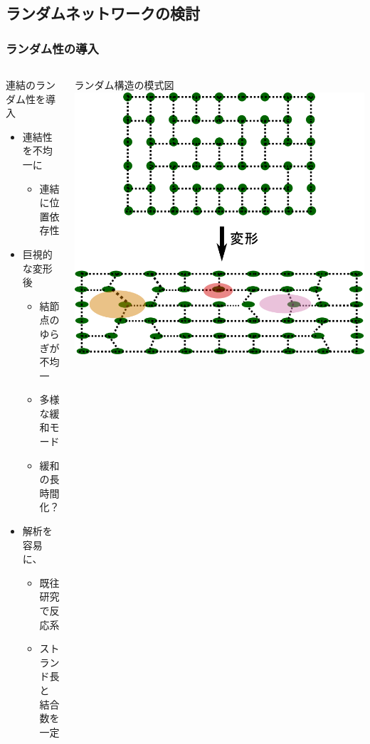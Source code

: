 \documentclass[12pt, dvipdfmx]{beamer}
\begin{document}
\subsection{ランダムネットワークの検討}
\begin{frame}
    \frametitle{ランダム性の導入}
    \vspace{-3mm}
		\begin{columns}[totalwidth=1\textwidth]
				\begin{block}{連結のランダム性を導入}
					\begin{itemize}
						\item 連結性を不均一に
							\begin{itemize}
								\item 連結に\alert{位置依存性}
							\end{itemize}
						\item 巨視的な変形後
							\begin{itemize}
								\item 結節点のゆらぎが\\不均一
								\item 多様な緩和モード
								\item \alert{緩和の長時間化？}
							\end{itemize}
						\item \alert{解析を容易}に、
                            \begin{itemize}
                                \item 既往研究で反応系
								\item \alert{ストランド長と\\結合数を一定}
							\end{itemize}
					\end{itemize}
				\end{block}
				ランダム構造の模式図
				\vspace{5mm}
				\includegraphics[width=\textwidth]{random_NW.png}

\end{columns}
\end{frame}
\end{document}
